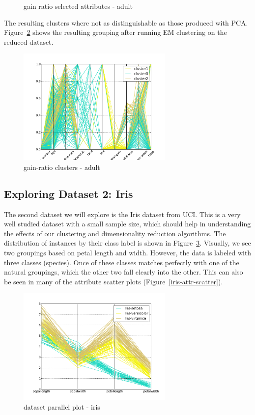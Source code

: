 \documentclass{sig-alternate}
\begin{document}
\begin{figure}[!htbp]
    \centering
    \theverbbox
    \caption{gain ratio selected attributes - adult\label{gain-adult}}
\end{figure}


The resulting clusters where not as distinguishable as those produced with PCA. Figure~\ref{parallel-gain-cluster} shows the resulting grouping after running EM clustering on the reduced dataset.

\begin{figure}[!htbp]
    \centering
    \includegraphics[width=3in]{part2/adult/parallel-gain-cluster.pdf}
    \caption{gain-ratio clusters - adult\label{parallel-gain-cluster}}
\end{figure} 




\subsection{Exploring Dataset 2: Iris}

The second dataset we will explore is the Iris dataset from UCI. This is a very well studied dataset with a small sample size, which should help in understanding the effects of our clustering and dimensionality reduction algorithms. The distribution of instances by their class label is shown in Figure~\ref{iris-parallel-class}. Visually, we see two groupings based on petal length and width. However, the data is labeled with three classes (species). Once of these classes matches perfectly with one of the natural groupings, which the other two fall clearly into the other. This can also be seen in many of the attribute scatter plots (Figure~\ref{iris-attr-scatter}).

\begin{figure}[!htbp]
    \centering
    \includegraphics[width=3in]{part2/iris/parallel-class.pdf}
    \caption{dataset parallel plot - iris\label{iris-parallel-class}}
\end{figure} 
\end{document}
